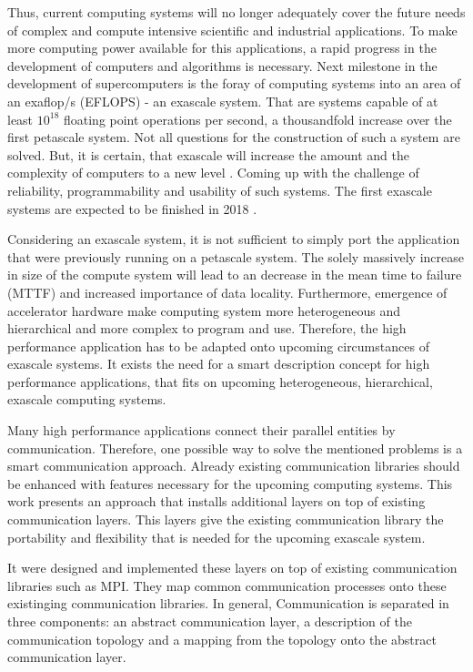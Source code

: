 Thus, current computing systems will no longer adequately cover the
future needs of complex and compute intensive scientific and
industrial applications.  To make more computing power available for
this applications, a rapid progress in the development of computers
and algorithms is necessary.  Next milestone in the development of
supercomputers is the foray of computing systems into an area of an
exaflop/s (EFLOPS) - an exascale system. That are systems capable of
at least $10^{18}$ floating point operations per second, a
thousandfold increase over the first petascale system.  Not all
questions for the construction of such a system are solved. But, it is
certain, that exascale will increase the amount and the complexity of
computers to a new level \cite{ref:cresta}. Coming up with the
challenge of reliability, programmability and usability of such
systems. The first exascale systems are expected to be finished in
2018 \cite{ref:cresta}.

Considering an exascale system, it is not sufficient to simply port
the application that were previously running on a petascale
system. The solely massively increase in size of the compute system
will lead to an decrease in the mean time to failure (MTTF) and
increased importance of data locality.  Furthermore, emergence of
accelerator hardware make computing system more heterogeneous and
hierarchical and more complex to program and use. Therefore, the high
performance application has to be adapted onto upcoming circumstances
of exascale systems. It exists the need for a smart description
concept for high performance applications, that fits on upcoming
heterogeneous, hierarchical, exascale computing systems.

Many high performance applications connect their parallel entities by
communication.  Therefore, one possible way to solve the mentioned
problems is a smart communication approach. Already existing
communication libraries should be enhanced with features necessary for
the upcoming computing systems.  This work presents an approach that
installs additional layers on top of existing communication
layers. This layers give the existing communication library the
portability and flexibility that is needed for the upcoming exascale
system.

It were designed and implemented these layers on top of existing
communication libraries such as MPI. They map common communication
processes onto these existinging communication libraries. In general,
Communication is separated in three components: an abstract
communication layer, a description of the communication topology and a
mapping from the topology onto the abstract communication layer.

